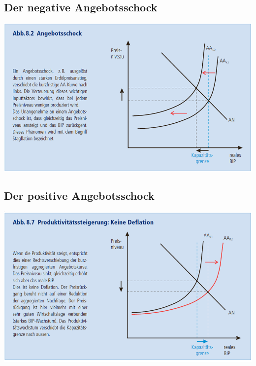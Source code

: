 \subsection{Der negative Angebotsschock}
\includegraphics[width=0.85\linewidth]{images/negangebot.png}
\clearpage
\pagebreak
\subsection{Der positive Angebotsschock}
\includegraphics[width=0.85\linewidth]{images/posangebot.png}
